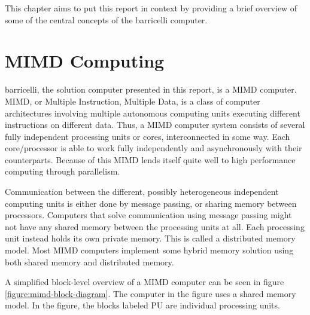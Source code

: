 This chapter aims to put this report in context by providing a brief overview of some of the central concepts of the \Gls{barricelli} computer.

\section{MIMD Computing}

\Gls{barricelli}, the solution computer presented in this report, is a \Gls{MIMD} computer. \Gls{MIMD}, or Multiple Instruction, Multiple Data, is a class of computer architectures involving multiple autonomous computing units executing different instructions on different data.
Thus, a MIMD computer system consists of several fully independent processing units or cores, interconnected in some way.
Each core/processor is able to work fully independently and asynchronously with their counterparts.
Because of this MIMD lends itself quite well to high performance computing through parallelism.

Communication between the different, possibly heterogeneous independent computing units is either done by message passing, or sharing memory between processors.
Computers that solve communication using message passing might not have any shared memory between the processing units at all.
Each processing unit instead holds its own private memory.
This is called a distributed memory model.
Most MIMD computers implement some hybrid memory solution using both shared memory and distributed memory.

A simplified block-level overview of a MIMD computer can be seen in figure \vref{figure:mimd-block-diagram}.
The computer in the figure uses a shared memory model.
In the figure, the blocks labeled PU are individual processing units.


